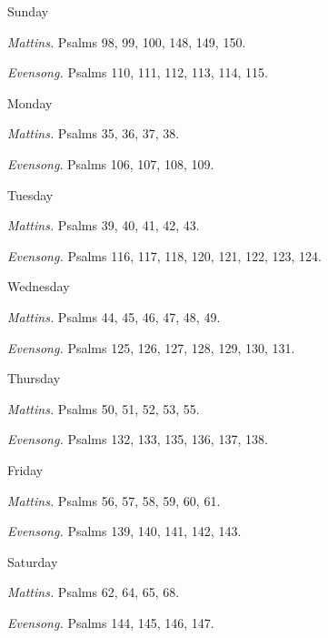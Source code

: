 \begin{paracol}{2}
\begin{leftcolumn}
	\end{leftcolumn}
	\begin{rightcolumn}
		\begin{inhead}
			Sunday
		\end{inhead}\par\noindent
		\textit{Mattins.} Psalms 98, 99, 100, 148, 149, 150.\par\noindent
		\textit{Evensong.} Psalms 110, 111, 112, 113, 114, 115.\par
		\begin{inhead}
			Monday
		\end{inhead}\par\noindent
		\textit{Mattins.} Psalms 35, 36, 37, 38.\par\noindent
		\textit{Evensong}. Psalms 106, 107, 108, 109.\par
		\begin{inhead}
			Tuesday
		\end{inhead}\par\noindent
		\textit{Mattins.} Psalms 39, 40, 41, 42, 43.\par\noindent
		\textit{Evensong.} Psalms 116, 117, 118, 120, 121, 122, 123, 124.\par
		\begin{inhead}
			Wednesday
		\end{inhead}\par\noindent
		\textit{Mattins.} Psalms 44, 45, 46, 47, 48, 49.\par\noindent
		\textit{Evensong.} Psalms 125, 126, 127, 128, 129, 130, 131.\par
		\begin{inhead}
			Thursday
		\end{inhead}\par\noindent
		\textit{Mattins.} Psalms 50, 51, 52, 53, 55.\par\noindent
		\textit{Evensong.} Psalms 132, 133, 135, 136, 137, 138.\par
		\begin{inhead}
			Friday
		\end{inhead}\par\noindent
		\textit{Mattins.} Psalms 56, 57, 58, 59, 60, 61.\par\noindent
		\textit{Evensong.} Psalms 139, 140, 141, 142, 143.\par
		\begin{inhead}
			Saturday
		\end{inhead}\par\noindent
		\textit{Mattins.} Psalms 62, 64, 65, 68.\par\noindent
		\textit{Evensong.} Psalms 144, 145, 146, 147.\par
	\end{rightcolumn}
	\switchcolumn*
\end{paracol}
